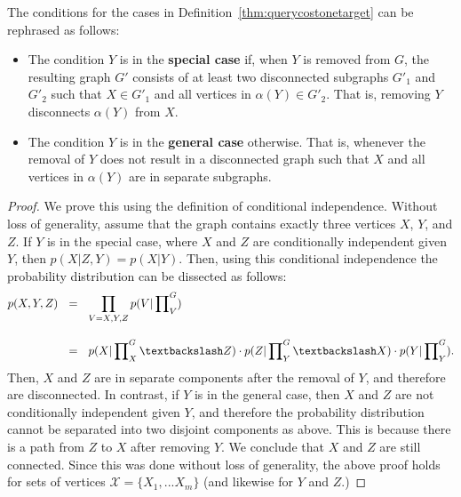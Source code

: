 
\begin{lemma}\label{lemma:alternativecases}
 The conditions for the cases in Definition~\ref{thm:querycostonetarget} can be rephrased as follows: 
\begin{itemize}
\item The condition $Y$ is in the \textbf{special case} if, when $Y$ is removed from $G$, the resulting graph $G'$ consists of at least two disconnected subgraphs $G'_{1}$ and $G'_{2}$ such that $X \in G'_{1}$ and all vertices in $\alpha(Y) \in G'_{2}$. That is, removing $Y$ disconnects $\alpha(Y)$ from $X$.
\item The condition $Y$ is in the \textbf{general case} otherwise. That is, whenever the removal of $Y$ does not result in a disconnected graph such that $X$ and all vertices in $\alpha(Y)$ are in separate subgraphs. 
\end{itemize}
\end{lemma}

\begin{proof}
We prove this using the definition of conditional independence. Without loss of generality, assume that the graph contains exactly three vertices $X$, $Y$, and $Z$. If $Y$ is in the special case, where $X$ and $Z$ are conditionally independent given $Y$, then $p(X|Z,Y) = p(X|Y)$. Then, using this conditional independence the probability distribution can be dissected as follows:
\begin{align*}
 p(X,Y,Z)& \ \ = \ \ \prod_{V= X,Y,Z} p(V| \prod\nolimits_{V}^{G}) \\[1em]
& \ \ = \ \ p(X|\prod\nolimits_{X}^{G} \textbackslash Z) \cdot p(Z|\prod\nolimits_{Y}^{G} \textbackslash X) \cdot p(Y|\prod\nolimits_{Y}^{G}).
\end{align*}
Then, $X$ and $Z$ are in separate components after the removal of $Y$, and therefore are disconnected. \newline
\null \quad \quad In contrast, if $Y$ is in the general case, then $X$ and $Z$ are not conditionally independent given $Y$, and therefore the probability distribution cannot be separated into two disjoint components as above. This is because there is a path from $Z$ to $X$ after removing $Y$. We conclude that $X$ and $Z$ are still connected. \newline
\null \quad \quad Since this was done without loss of generality, the above proof holds for sets of vertices $\mathcal{X} = \{X_{1}, ... X_{m}\}$ (and likewise for $Y$ and $Z$.)
\end{proof}

